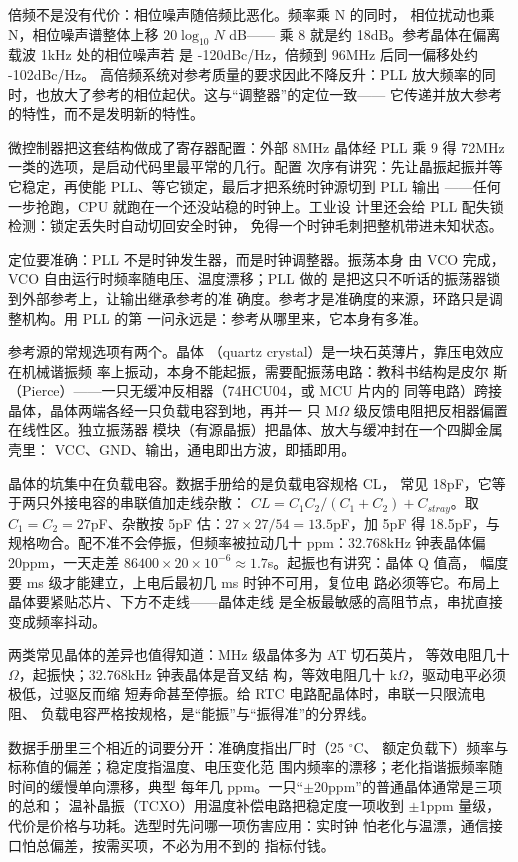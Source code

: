 倍频不是没有代价：相位噪声随倍频比恶化。频率乘 N 的同时，
相位扰动也乘 N，相位噪声谱整体上移 $20\log_{10}N$ dB——
乘 8 就是约 18dB。参考晶体在偏离载波 1kHz 处的相位噪声若
是 -120dBc/Hz，倍频到 96MHz 后同一偏移处约 -102dBc/Hz。
高倍频系统对参考质量的要求因此不降反升：PLL 放大频率的同
时，也放大了参考的相位起伏。这与“调整器”的定位一致——
它传递并放大参考的特性，而不是发明新的特性。

微控制器把这套结构做成了寄存器配置：外部 8MHz 晶体经 PLL
乘 9 得 72MHz 一类的选项，是启动代码里最平常的几行。配置
次序有讲究：先让晶振起振并等它稳定，再使能 PLL、等它锁定，最后才把系统时钟源切到 PLL 输出
——任何一步抢跑，CPU 就跑在一个还没站稳的时钟上。工业设
计里还会给 PLL 配失锁检测：锁定丢失时自动切回安全时钟，
免得一个时钟毛刺把整机带进未知状态。

定位要准确：PLL 不是时钟发生器，而是时钟调整器。振荡本身
由 VCO 完成，VCO 自由运行时频率随电压、温度漂移；PLL 做的
是把这只不听话的振荡器锁到外部参考上，让输出继承参考的准
确度。参考才是准确度的来源，环路只是调整机构。用 PLL 的第
一问永远是：参考从哪里来，它本身有多准。

参考源的常规选项有两个。晶体
（quartz crystal）是一块石英薄片，靠压电效应在机械谐振频
率上振动，本身不能起振，需要配振荡电路：教科书结构是皮尔
斯（Pierce）——一只无缓冲反相器（74HCU04，或 MCU 片内的
同等电路）跨接晶体，晶体两端各经一只负载电容到地，再并一
只 M$\Omega$ 级反馈电阻把反相器偏置在线性区。独立振荡器
模块（有源晶振）把晶体、放大与缓冲封在一个四脚金属壳里：
VCC、GND、输出，通电即出方波，即插即用。

晶体的坑集中在负载电容。数据手册给的是负载电容规格 CL，
常见 18pF，它等于两只外接电容的串联值加走线杂散：
$CL = C_1 C_2 / (C_1 + C_2) + C_{stray}$。取 $C_1 = C_2 =
27$pF、杂散按 5pF 估：$27 \times 27 / 54 = 13.5$pF，加 5pF
得 18.5pF，与规格吻合。配不准不会停振，但频率被拉动几十
ppm：32.768kHz 钟表晶体偏 20ppm，一天走差 $86400 \times
20 \times 10^{-6} \approx 1.7$s。起振也有讲究：晶体 Q 值高，
幅度要 ms 级才能建立，上电后最初几 ms 时钟不可用，复位电
路必须等它。布局上晶体要紧贴芯片、下方不走线——晶体走线
是全板最敏感的高阻节点，串扰直接变成频率抖动。

两类常见晶体的差异也值得知道：MHz 级晶体多为 AT 切石英片，
等效电阻几十 $\Omega$，起振快；32.768kHz 钟表晶体是音叉结
构，等效电阻几十 k$\Omega$，驱动电平必须极低，过驱反而缩
短寿命甚至停振。给 RTC 电路配晶体时，串联一只限流电阻、
负载电容严格按规格，是“能振”与“振得准”的分界线。

数据手册里三个相近的词要分开：准确度指出厂时（25 $^{\circ}$C、
额定负载下）频率与标称值的偏差；稳定度指温度、电压变化范
围内频率的漂移；老化指谐振频率随时间的缓慢单向漂移，典型
每年几 ppm。一只“$\pm$20ppm”的普通晶体通常是三项的总和；
温补晶振（TCXO）用温度补偿电路把稳定度一项收到 $\pm$1ppm
量级，代价是价格与功耗。选型时先问哪一项伤害应用：实时钟
怕老化与温漂，通信接口怕总偏差，按需买项，不必为用不到的
指标付钱。

